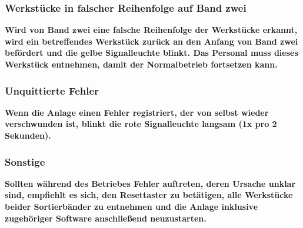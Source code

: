 \documentclass[oneside,a4paper,titlepage]{scrartcl} %
\begin{document}
\subsubsection{Werkstücke in falscher Reihenfolge auf Band zwei}
\textbf{Wird von Band zwei eine falsche Reihenfolge der Werkstücke erkannt, wird ein betreffendes Werkstück zurück an den Anfang von Band zwei befördert und die gelbe Signalleuchte blinkt. Das Personal muss dieses Werkstück entnehmen, damit der Normalbetrieb fortsetzen kann.}

\subsubsection{Unquittierte Fehler}
\textbf{Wenn die Anlage einen Fehler registriert, der von selbst wieder verschwunden ist, blinkt die rote Signalleuchte langsam (1x pro 2 Sekunden). }

\subsubsection{Sonstige}
\textbf{Sollten während des Betriebes Fehler auftreten, deren Ursache unklar sind, empfiehlt es sich, den Resettaster zu betätigen, alle Werkstücke beider Sortierbänder zu entnehmen und die Anlage inklusive zugehöriger Software anschließend neuzustarten.}
\end{document}
